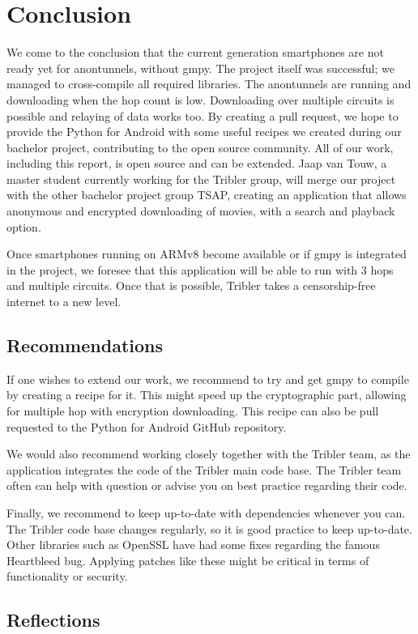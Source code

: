 \chapter{Conclusion}
	We come to the conclusion that the current generation smartphones are not ready yet for anontunnels, without gmpy. The project itself was successful; we managed to cross-compile all required libraries. The anontunnels are running and downloading when the hop count is low. Downloading over multiple circuits is possible and relaying of data works too. By creating a pull request, we hope to provide the Python for Android with some useful recipes we created during our bachelor project, contributing to the open source community. 
	All of our work, including this report, is open source and can be extended. Jaap van Touw, a master student currently working for the Tribler group, will merge our project with the other bachelor project group TSAP, creating an application that allows anonymous and encrypted downloading of movies, with a search and playback option.
	
	
	Once smartphones running on ARMv8 become available or if gmpy is integrated in the project, we foresee that this application will be able to run with 3 hops and multiple circuits. Once that is possible, Tribler takes a censorship-free internet to a new level.
	
	\section{Recommendations}
		If one wishes to extend our work, we recommend to try and get gmpy to compile by creating a recipe for it. This might speed up the cryptographic part, allowing for multiple hop with encryption downloading. This recipe can also be pull requested to the Python for Android GitHub repository.
		
		We would also recommend working closely together with the Tribler team, as the application integrates the code of the Tribler main code base. The Tribler team often can help with question or advise you on best practice regarding their code.
		
		Finally, we recommend to keep up-to-date with dependencies whenever you can. The Tribler code base changes regularly, so it is good practice to keep up-to-date. Other libraries such as OpenSSL have had some fixes regarding the famous Heartbleed bug. Applying patches like these might be critical in terms of functionality or security.
		
	\section{Reflections}
	
